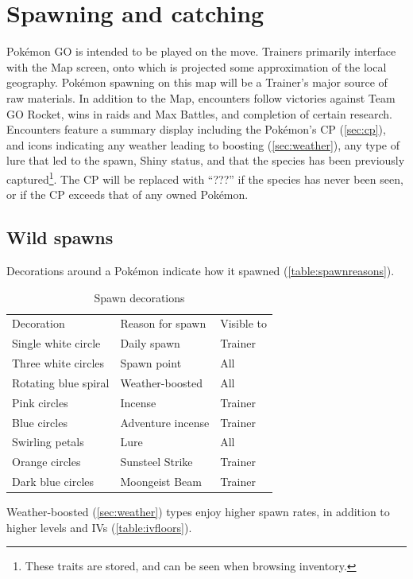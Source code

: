 \chapter{Spawning and catching}
\label{chap:spawn}
Pokémon GO is intended to be played on the move.
Trainers primarily interface with the Map screen, onto which is projected
  some approximation of the local geography.
Pokémon spawning on this map will be a Trainer's major source of raw materials.
In addition to the Map, encounters follow victories against Team GO Rocket,
  wins in raids and Max Battles, and completion of certain research.
Encounters feature a summary display including the Pokémon's CP (\autoref{sec:cp}),
  and icons indicating any weather leading to boosting (\autoref{sec:weather}),
  any type of lure that led to the spawn,
  Shiny status,
  and that the species has been previously captured\footnote{These traits are stored, and can be seen when browsing inventory.}.
The CP will be replaced with ``???'' if the species has never been seen, or if
  the CP exceeds that of any owned Pokémon.

\section{Wild spawns}
\label{sec:spawns}
Decorations around a Pokémon indicate how it spawned (\autoref{table:spawnreasons}).
\begin{table}
\centering
\begin{tabular}{lll}
  Decoration & Reason for spawn & Visible to\\
\Midrule
  Single white circle & Daily spawn & Trainer\\
  Three white circles & Spawn point & All\\
  Rotating blue spiral & Weather-boosted & All\\
  Pink circles & Incense & Trainer\\
  Blue circles & Adventure incense & Trainer\\
  Swirling petals & Lure & All\\
  Orange circles & Sunsteel Strike & Trainer\\
  Dark blue circles & Moongeist Beam & Trainer\\
\end{tabular}
\caption{Spawn decorations}
\label{table:spawnreasons}
\end{table}
Weather-boosted (\autoref{sec:weather}) types enjoy higher spawn rates,
  in addition to higher levels and IVs (\autoref{table:ivfloors}).

